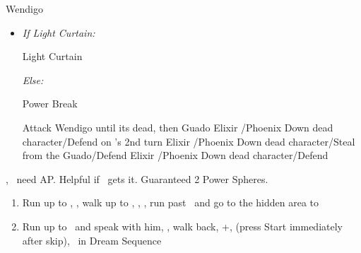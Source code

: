 \winvfill
\bothvfill
\begin{battle}[18000]{Wendigo}
	\begin{itemize}
		\tidusf Haste \tidus
		\tidusf Switch Weapon to Brotherhood
		\tidusf Attack Guado B (Top One)
		\item \textit{If Light Curtain:}
			\begin{itemize}
				\rikkuf Light Curtain \tidus
			\end{itemize}
		\textit{Else:}
			\begin{itemize}
				\switch{\rikku}{\auron}
				\auronf Power Break
			\end{itemize}
		\tidusf Attack Wendigo until its dead, then Guado
		\yunaf Elixir \tidus/Phoenix Down dead character/Defend
		\switch{\yuna}{\lulu} on \yuna's 2nd turn
		\rikkuf Elixir \tidus/Phoenix Down dead character/Steal from the Guado/Defend
		\luluf Elixir \tidus/Phoenix Down dead character/Defend
	\end{itemize}
	\yuna, \tidus\ need AP. Helpful if \lulu\ gets it.
	Guaranteed 2 Power Spheres.
\end{battle}
\begin{enumerate}[resume]
	\item Run up to \rikku, \sd, walk up to \yuna, \sd, \save, run past \kimahri\ and go to the hidden area to 
	\winvfill
	\item Run up to \auron\ and speak with him, \sd, walk back, \cs+\skippablefmv[1:00], (press Start immediately after skip), \sd\ in Dream Sequence
\end{enumerate}